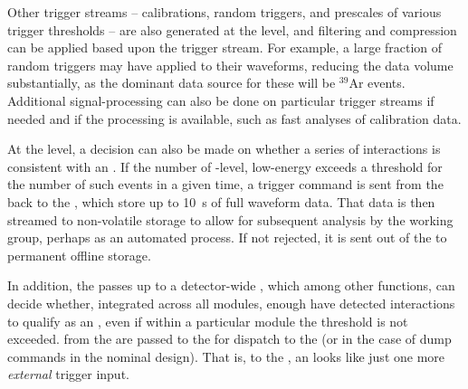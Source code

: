 Other trigger streams -- calibrations, random triggers, and prescales
of various trigger thresholds -- are also generated at the
 level, and filtering and compression can be applied
based upon the trigger stream. 
For example, a large fraction of random triggers may have 
applied to their waveforms, reducing the data volume substantially, as
the dominant data source for these will be $^{39}$Ar events.
Additional signal-processing can also be done on particular trigger
streams if needed and if the processing is available, such as fast
analyses of calibration data.

At the  level, a decision can also be made on whether
a series of interactions is consistent with an . 
If the number of -level, low-energy
 exceeds a threshold for the number of such
events in a given time, a trigger command is sent from the 
back to the , which store up to \SI{10}{\s} of full
waveform data. 
That data is then streamed to non-volatile storage to allow for
subsequent analysis by the  working group, perhaps as an
automated process. 
If not rejected, it is sent out of the  to permanent offline
storage.

In addition, the  passes  up to a
detector-wide , which among other functions, can decide
whether, integrated across all modules, enough  have
detected interactions to qualify as an , even if within a
particular module the threshold is not exceeded. 
 from the  are passed to the
 for dispatch to the  (or  in the
case of  dump commands in the nominal design). 
That is, to the , an  looks like just
one more \textit{external} trigger input.

